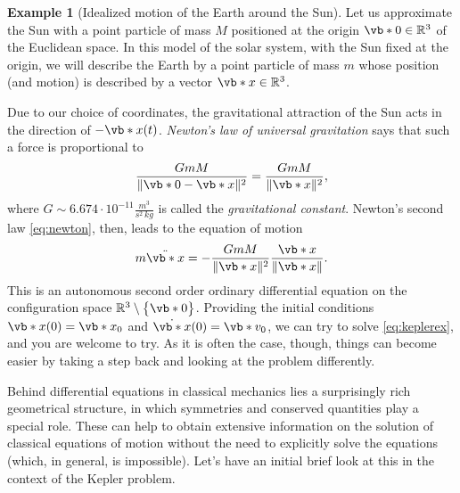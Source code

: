 \documentclass[english,fontsize=11pt,paper=b5]{scrbook}
\numberwithin{equation}{chapter}
\theoremstyle{definition}
\newtheorem{example}{Example}[chapter]
\newcommand{\emphidx}[1]{\index{#1}\emph{#1}}
\begin{document}
  \begin{example}[Idealized motion of the Earth around the Sun]\label{ex:Kepler0}
    Let us approximate the Sun with a point particle of mass $M$ positioned at the origin $\vb*{0}\in\mathbb{R}^3$ of the Euclidean space.
    In this model of the solar system, with the Sun fixed at the origin, we will describe the Earth by a point particle of mass $m$ whose position (and motion) is described by a vector $\vb*{x}\in\mathbb{R}^3$.

    Due to our choice of coordinates, the gravitational attraction of the Sun acts in the direction of $-\vb*{x}(t)$.
    \emph{Newton's law of universal gravitation}  says that such a force is proportional to
    \begin{equation}
      \frac{GmM}{\|\vb*{0}-\vb*{x}\|^2} = \frac{GmM}{\|\vb*{x}\|^2},
    \end{equation}
    where $G \sim 6.674 \cdot 10^{-11} \frac{m^3}{s^2\,kg}$ is called the \emphidx{gravitational constant}.
    Newton's second law \eqref{eq:newton}, then, leads to the equation of motion
    \begin{equation}\label{eq:keplerex}
      m \ddot{\vb*{x}} = - \frac{GmM}{\|\vb*{x}\|^2} \frac{\vb*{x}}{\|\vb*{x}\|}.
    \end{equation}
    This is an autonomous second order ordinary differential equation on the configuration space $\mathbb{R}^3\setminus\big\{\vb*{0}\big\}$.
    Providing the initial conditions $\vb*{x}(0)=\vb*{x}_0$ and $\dot{\vb*{x}}(0)=\vb*{v}_0$, we can try to solve \eqref{eq:keplerex}, and you are welcome to try.
    As it is often the case, though, things can become easier by taking a step back and looking at the problem differently.\medskip

    Behind differential equations in classical mechanics lies a surprisingly rich geometrical structure, in which symmetries and conserved quantities play a special role.
    These can help to obtain extensive information on the solution of classical equations of motion without the need to explicitly solve the equations (which, in general, is impossible).
    Let's have an initial brief look at this in the context of the Kepler problem.


\end{example}
\end{document}
